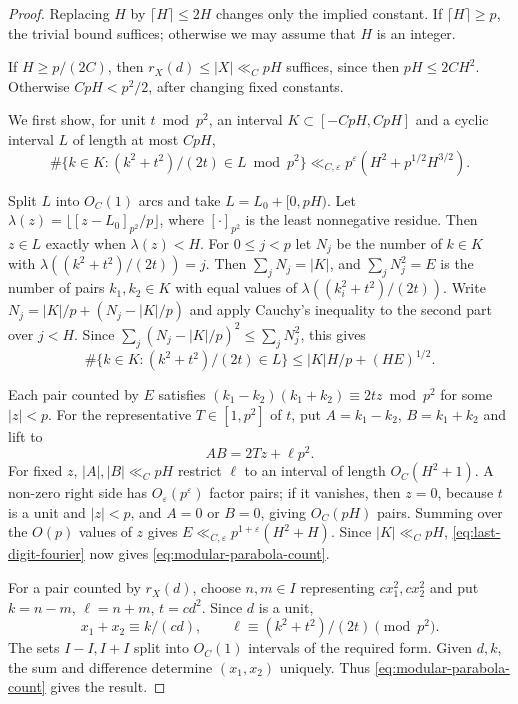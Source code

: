 \documentclass[12pt, a4paper]{amsart}
\numberwithin{equation}{section}
\newcommand{\ep}{\varepsilon}
\renewcommand{\le}{\leqslant}
\renewcommand{\ge}{\geqslant}
\theoremstyle{plain}
\begin{document}
\begin{proof}
Replacing $H$ by $\lceil H\rceil\le2H$ changes only the implied constant. If $\lceil H\rceil\ge p$, the trivial bound suffices; otherwise we may assume that $H$ is an integer.

If $H\ge p/(2C)$, then $r_X(d)\le |X|\ll_CpH$ suffices, since then $pH\le2CH^2$. Otherwise $CpH<p^2/2$, after changing fixed constants.

We first show, for unit $t\bmod p^2$, an interval $K\subset[-CpH,CpH]$ and a cyclic interval $L$ of length at most $CpH$,
\begin{equation}\label{eq:modular-parabola-count}
\#\{k\in K:(k^2+t^2)/(2t)\in L\bmod {p^2}\}
\ll_{C,\ep}p^\ep(H^2+p^{1/2}H^{3/2}).
\end{equation}

Split $L$ into $O_C(1)$ arcs and take $L=L_0+[0,pH)$. Let $\lambda(z)=\lfloor[z-L_0]_{p^2}/p\rfloor$, where $[\cdot]_{p^2}$ is the least nonnegative residue. Then $z\in L$ exactly when $\lambda(z)<H$. For $0\le j<p$ let $N_j$ be the number of $k\in K$ with $\lambda((k^2+t^2)/(2t))=j$. Then $\sum_jN_j=|K|$, and $\sum_jN_j^2=E$ is the number of pairs $k_1,k_2\in K$ with equal values of $\lambda((k_i^2+t^2)/(2t))$. Write $N_j=|K|/p+(N_j-|K|/p)$ and apply Cauchy's inequality to the second part over $j<H$. Since $\sum_j(N_j-|K|/p)^2\le\sum_jN_j^2$, this gives
\begin{equation}\label{eq:last-digit-fourier}
\#\{k\in K:(k^2+t^2)/(2t)\in L\}
\le |K|H/p+(H E)^{1/2}.
\end{equation}

Each pair counted by $E$ satisfies $(k_1-k_2)(k_1+k_2)\equiv2t z\bmod {p^2}$ for some $|z|<p$. For the representative $T\in[1,p^2]$ of $t$, put $A=k_1-k_2$, $B=k_1+k_2$ and lift to
\begin{equation}\label{eq:parabola-divisor-lift}
AB=2T z+\ell p^2.
\end{equation}
For fixed $z$, $|A|,|B|\ll_CpH$ restrict $\ell$ to an interval of length $O_C(H^2+1)$. A non-zero right side has $O_\ep(p^\ep)$ factor pairs; if it vanishes, then $z=0$, because $t$ is a unit and $|z|<p$, and $A=0$ or $B=0$, giving $O_C(pH)$ pairs. Summing over the $O(p)$ values of $z$ gives $E\ll_{C,\ep}p^{1+\ep}(H^2+H)$. Since $|K|\ll_CpH$, \eqref{eq:last-digit-fourier} now gives \eqref{eq:modular-parabola-count}.

For a pair counted by $r_X(d)$, choose $n,m\in I$ representing $cx_1^2,cx_2^2$ and put $k=n-m$, $\ell=n+m$, $t=cd^2$. Since $d$ is a unit,
$$
x_1+x_2\equiv k/(cd),\qquad \ell\equiv(k^2+t^2)/(2t)\pmod{p^2}.
$$
The sets $I-I,I+I$ split into $O_C(1)$ intervals of the required form. Given $d,k$, the sum and difference determine $(x_1,x_2)$ uniquely. Thus \eqref{eq:modular-parabola-count} gives the result.
\end{proof}
\end{document}
